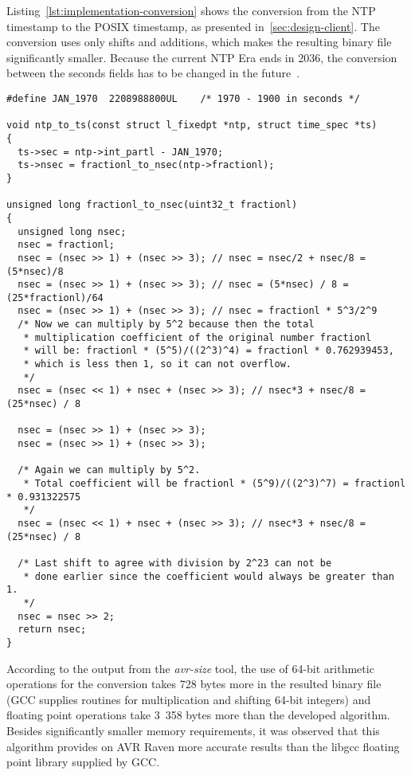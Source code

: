 Listing~\ref{lst:implementation-conversion} shows the conversion from the NTP timestamp to the POSIX timestamp,
as presented in~\ref{sec:design-client}.
The conversion uses only shifts and additions, which makes the resulting binary file
significantly smaller.
Because the current NTP Era ends in 2036,
the conversion between the seconds fields has to be changed in the future~\cite{ntp-y2k}.
\begin{lstlisting}[caption={Conversion from NTP timestamp to POSIX timestamp},label={lst:implementation-conversion}]
#define	JAN_1970  2208988800UL    /* 1970 - 1900 in seconds */

void ntp_to_ts(const struct l_fixedpt *ntp, struct time_spec *ts)
{
  ts->sec = ntp->int_partl - JAN_1970;
  ts->nsec = fractionl_to_nsec(ntp->fractionl);
}

unsigned long fractionl_to_nsec(uint32_t fractionl)
{
  unsigned long nsec;
  nsec = fractionl;
  nsec = (nsec >> 1) + (nsec >> 3); // nsec = nsec/2 + nsec/8 = (5*nsec)/8
  nsec = (nsec >> 1) + (nsec >> 3); // nsec = (5*nsec) / 8 = (25*fractionl)/64
  nsec = (nsec >> 1) + (nsec >> 3); // nsec = fractionl * 5^3/2^9
  /* Now we can multiply by 5^2 because then the total
   * multiplication coefficient of the original number fractionl
   * will be: fractionl * (5^5)/((2^3)^4) = fractionl * 0.762939453,
   * which is less then 1, so it can not overflow.
   */
  nsec = (nsec << 1) + nsec + (nsec >> 3); // nsec*3 + nsec/8 = (25*nsec) / 8

  nsec = (nsec >> 1) + (nsec >> 3);
  nsec = (nsec >> 1) + (nsec >> 3);

  /* Again we can multiply by 5^2.
   * Total coefficient will be fractionl * (5^9)/((2^3)^7) = fractionl * 0.931322575
   */
  nsec = (nsec << 1) + nsec + (nsec >> 3); // nsec*3 + nsec/8 = (25*nsec) / 8

  /* Last shift to agree with division by 2^23 can not be
   * done earlier since the coefficient would always be greater than 1.
   */
  nsec = nsec >> 2;
  return nsec;
}
\end{lstlisting}
According to the output from the {\it{avr-size}} tool,
the use of 64-bit arithmetic operations for the conversion
takes 728 bytes more in the
resulted binary file (GCC supplies routines for multiplication and shifting 64-bit integers)
and floating point operations take 3~358 bytes more
than the developed algorithm.
Besides significantly smaller memory requirements,
it was observed that this algorithm provides on AVR Raven
more accurate results than the libgcc floating point library supplied by GCC.
